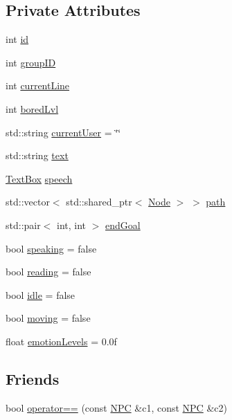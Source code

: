 \subsection*{Private Attributes}
\begin{DoxyCompactItemize}
\item 
int \hyperlink{class_n_p_c_a1b705223f885df652f2faffc4735d03c}{id}
\item 
int \hyperlink{class_n_p_c_ab370e8a4fbb5ccabdc06821f7dfda428}{group\+ID}
\item 
int \hyperlink{class_n_p_c_a0969e4514a21f3b2966a24d78e9e3343}{current\+Line}
\item 
int \hyperlink{class_n_p_c_a1f67b7dfca770653fc523dfc558e7fdf}{bored\+Lvl}
\item 
std\+::string \hyperlink{class_n_p_c_a944f970943002adc4f0c970b0200c011}{current\+User} = \char`\"{}\char`\"{}
\item 
std\+::string \hyperlink{class_n_p_c_a64ad332dcfeb84a7a6bedd404378f05b}{text}
\item 
\hyperlink{class_text_box}{Text\+Box} \hyperlink{class_n_p_c_a1a1be15df827227f45559388897a9cd5}{speech}
\item 
std\+::vector$<$ std\+::shared\+\_\+ptr$<$ \hyperlink{class_node}{Node} $>$ $>$ \hyperlink{class_n_p_c_afdd6b1a6e4827259ec9d9fcd075cb099}{path}
\item 
std\+::pair$<$ int, int $>$ \hyperlink{class_n_p_c_ab2349a8d6757b61a73f87de9cba387d1}{end\+Goal}
\item 
bool \hyperlink{class_n_p_c_a0dc17cd2d9b7d486e6d74089819117e7}{speaking} = false
\item 
bool \hyperlink{class_n_p_c_a04d8f196cdd6de84f38131836d9c9cc7}{reading} = false
\item 
bool \hyperlink{class_n_p_c_aa228d3e449507a6326cef7b449752e62}{idle} = false
\item 
bool \hyperlink{class_n_p_c_a4dfc6a89cae1301e7f722bbba67f3dbb}{moving} = false
\item 
float \hyperlink{class_n_p_c_a804b5c812457417231e3b4ab5e06ac88}{emotion\+Levels} = 0.\+0f
\end{DoxyCompactItemize}
\subsection*{Friends}
\begin{DoxyCompactItemize}
\item 
bool \hyperlink{class_n_p_c_a3e1f9defd10ab4be568a190fbcd0ac07}{operator==} (const \hyperlink{class_n_p_c}{N\+PC} \&c1, const \hyperlink{class_n_p_c}{N\+PC} \&c2)
\end{DoxyCompactItemize}


